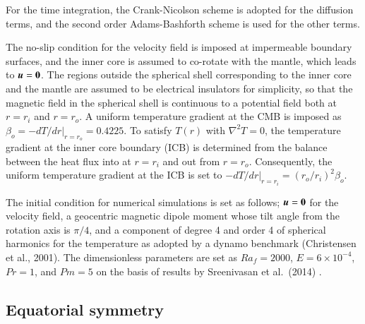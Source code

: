 For the time integration, the Crank-Nicolson scheme is adopted for the diffusion terms, and the second order Adams-Bashforth scheme is used for the other terms.

The no-slip condition for the velocity field is imposed at impermeable boundary surfaces, and the inner core is assumed to co-rotate with the mantle, which leads to $\mbox{\boldmath$u$} = {\bf 0}$.
The regions outside the spherical shell corresponding to the inner core and the mantle are assumed to be electrical insulators for simplicity, so that the magnetic field in the spherical shell is continuous to a potential field both at $r = r_i$ and $r = r_o$.
A uniform temperature gradient at the CMB is imposed as $\beta_o = -d T / dr |_{r = r_o} = 0.4225$. 
To satisfy $T (r)$ with $\nabla^2 T = 0$,
the temperature gradient at the inner core boundary (ICB) is determined from the balance between the heat flux into at $r = r_i$ and out from $r = r_o$. 
Consequently, the uniform temperature gradient at the ICB is set to $-d T / dr |_{r = r_i} = (r_o/r_i)^2 \beta_o$.

The initial condition for numerical simulations is set as follows; $\mbox{\boldmath$u$} = {\bf 0}$ for the velocity field, a geocentric magnetic dipole moment whose tilt angle from the rotation axis is $\pi / 4$, and a component of degree 4 and order 4 of spherical harmonics for the temperature as adopted by a dynamo benchmark (Christensen et al., 2001).
The dimensionless parameters are set as $Ra_f = 2000$, $E = 6 \times 10^{-4}$, $Pr = 1$, and $Pm = 5$ on the basis of results by Sreenivasan et al.\ (2014) \cite{Sreenivasan:2014}.


\subsection{Equatorial symmetry}

